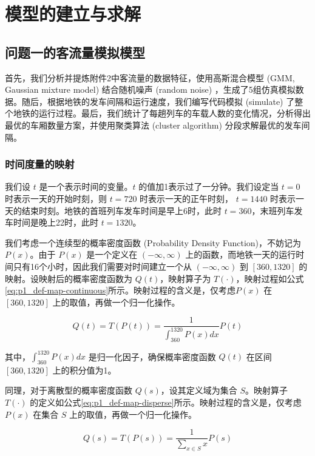 \documentclass[12pt,a4paper]{mcmthesis}
\begin{document}
    \section{模型的建立与求解}

    \subsection{问题一的客流量模拟模型}

    首先，我们分析并提炼附件2中客流量的数据特征，使用高斯混合模型 (GMM, Gaussian mixture model) 结合随机噪声 (random noise) ，生成了5组仿真模拟数据。随后，根据地铁的发车间隔和运行速度，我们编写代码模拟 (simulate) 了整个地铁的运行过程。最后，我们统计了每趟列车的车载人数的变化情况，分析得出最优的车厢数量方案，并使用聚类算法 (cluster algorithm) 分段求解最优的发车间隔。

    \subsubsection{时间度量的映射}

    我们设 $t$ 是一个表示时间的变量。$t$ 的值加1表示过了一分钟。我们设定当 $t=0$ 时表示一天的开始时刻，则 $t=720$ 时表示一天的正午时刻， $t=1440$ 时表示一天的结束时刻。地铁的首班列车发车时间是早上6时，此时 $t=360$，末班列车发车时间是晚上22时，此时 $t=1320$。

    我们考虑一个连续型的概率密度函数 (Probability Density Function)，不妨记为 $P(x)$。由于 $P(x)$ 是一个定义在 $(-\infty,\infty)$ 上的函数，而地铁一天的运行时间只有16个小时，因此我们需要对时间建立一个从 $(-\infty,\infty)$ 到 $[360,1320]$ 的映射。设映射后的概率密度函数为 $Q(t)$，映射算子为 $T(\cdot)$，映射过程如公式\ref{eq:p1_def-map-continuous}所示。映射过程的含义是，仅考虑$P(x)$ 在 $[360,1320]$ 上的取值，再做一个归一化操作。

    \begin{equation}
        Q(t) = T(P(t)) = \frac{1}{\int_{360}^{1320}P(x)dx} P(t)
        \label{eq:p1_def-map-continuous}
    \end{equation}

    其中，$\int_{360}^{1320}P(x)dx$ 是归一化因子，确保概率密度函数 $Q(t)$ 在区间 $[360,1320]$ 上的积分值为1。

    同理，对于离散型的概率密度函数 $Q(s)$，设其定义域为集合 $S$。映射算子 $T(\cdot)$ 的定义如公式\ref{eq:p1_def-map-disperse}所示。映射过程的含义是，仅考虑$P(x)$ 在集合 $S$ 上的取值，再做一个归一化操作。

    \begin{equation}
        Q(s) = T(P(s)) = \frac{1}{\sum_{x \in S} x} P(s)
        \label{eq:p1_def-map-disperse}
    \end{equation}
\end{document}
